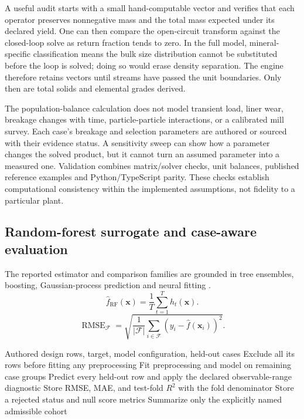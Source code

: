 \documentclass[10pt]{article}
\begin{document}
A useful audit starts with a small hand-computable vector and verifies
that each operator preserves nonnegative mass and the total mass
expected under its declared yield. One can then compare the open-circuit
transform against the closed-loop solve as return fraction tends to
zero. In the full model, mineral-specific classification means the bulk
size distribution cannot be substituted before the loop is solved; doing
so would erase density separation. The engine therefore retains vectors
until streams have passed the unit boundaries. Only then are total
solids and elemental grades derived.

The population-balance calculation does not model transient load, liner
wear, breakage changes with time, particle-particle interactions, or a
calibrated mill survey. Each case's breakage and selection parameters
are authored or sourced with their evidence status. A sensitivity sweep
can show how a parameter changes the solved product, but it cannot turn
an assumed parameter into a measured one. Validation combines
matrix/solver checks, unit balances, published reference examples and
Python/TypeScript parity. These checks establish computational
consistency within the implemented assumptions, not fidelity to a
particular plant.

\subsection{Random-forest surrogate and case-aware
evaluation}\label{random-forest-surrogate-and-case-aware-evaluation}

\label{method-random-forest}

The reported estimator and comparison families are grounded in tree
ensembles, boosting, Gaussian-process prediction and neural fitting
\cite{breiman2001,friedman2001,rasmussen2006,loschchilov2019,hoffimann2022}.
\begin{equation}
\widehat{f}_{\mathrm{RF}}(\mathbf{x})=\frac{1}{T}\sum_{t=1}^{T}h_t(\mathbf{x}).
\end{equation} \begin{equation}
\operatorname{RMSE}_{\mathcal{F}}=
\sqrt{\frac{1}{|\mathcal{F}|}\sum_{i\in\mathcal{F}}(y_i-\widehat{f}(\mathbf{x}_i))^2}.
\end{equation}

\begin{algorithm}
\caption{Fit and score a case-aware surrogate}
\label{alg:case-aware-learning}
\begin{algorithmic}[1]
\Require Authored design rows, target, model configuration, held-out cases
\State Exclude all its rows before fitting any preprocessing
\State Fit preprocessing and model on remaining case groups
\State Predict every held-out row and apply the declared observable-range diagnostic
\State Store RMSE, MAE, and test-fold $R^2$ with the fold denominator
\Else
\State Store a rejected status and null score metrics
\EndIf
\EndFor
\State Summarize only the explicitly named admissible cohort
\end{algorithmic}
\end{algorithm}
\end{document}
